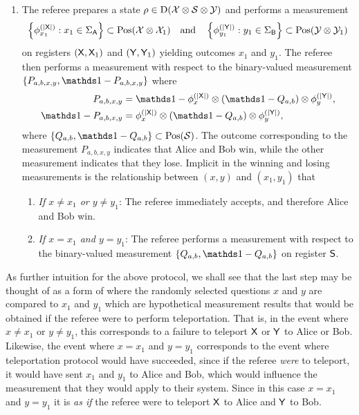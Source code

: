 \begin{enumerate}
	\item The referee prepares a state $\rho \in \mathrm{D}(\mathcal{X} \otimes \mathcal{S} \otimes \mathcal{Y})$ and performs a measurement
		\begin{align} \label{eq:bell-basis-telep-game-2}
			\left \{ \phi_{x_1}^{(\left\lvert \mathsf{X} \right\rvert)} : x_1 \in \Sigma_{\mathsf{A}} \right \} \subset \mathrm{Pos}(\mathcal{X} \otimes \mathcal{X}_1) \quad \textnormal{and} \quad \left \{ \phi_{y_1}^{(\left\lvert \mathsf{Y} \right\rvert)} : y_1 \in \Sigma_{\mathsf{B}}  \right \} \subset \mathrm{Pos}(\mathcal{Y} \otimes \mathcal{Y}_1)
		\end{align}		
on registers $(\mathsf{X},\mathsf{X}_1)$ and $(\mathsf{Y},\mathsf{Y}_1)$ yielding outcomes $x_1$ and $y_1$. The referee then performs a measurement with respect to the binary-valued measurement $\{ P_{a,b,x,y}, \I - P_{a,b,x,y} \}$ where
\begin{equation} \label{eq:ref-meas-telep-enlg}
	\begin{aligned}
		P_{a,b,x,y} &= \I - \phi^{(\abs{\reg{X}})}_{x} \otimes \left( \I - Q_{a,b} \right) \otimes \phi^{(\abs{\reg{Y}})}_y, \\
		\I - P_{a,b,x,y} &= \phi^{(\abs{\reg{X}})}_{x} \otimes \left( \I - Q_{a,b} \right) \otimes \phi^{(\abs{\reg{Y}})}_y, \\
	\end{aligned}	
\end{equation}	 
where $\{Q_{a,b}, \I - Q_{a,b} \} \subset \Pos(\S)$. The outcome corresponding to the measurement $P_{a,b,x,y}$ indicates that Alice and Bob win, while the other measurement indicates that they lose. Implicit in the winning and losing measurements is the relationship between $(x,y)$ and $(x_1,y_1)$ that
\begin{enumerate}
		\item \emph{If $x \not= x_1$ or $y \not= y_1$}: The referee immediately accepts, and therefore Alice and Bob win. 
		\item \emph{If $x = x_1$ and $y = y_1$}: The referee performs a measurement with respect to the binary-valued measurement $\{Q_{a,b}, \I - Q_{a,b} \}$ on register $\mathsf{S}$.
	\end{enumerate}
\end{enumerate}
As further intuition for the above protocol, we shall see that the last step may be thought of as a form of  where the randomly selected questions $x$ and $y$ are compared to $x_1$ and $y_1$ which are hypothetical measurement results that would be obtained if the referee were to perform teleportation. That is, in the event where $x \not= x_1$ or $y \not= y_1$, this corresponds to a failure to teleport $\mathsf{X}$ or $\mathsf{Y}$ to Alice or Bob. Likewise, the event where $x = x_1$ and $y = y_1$ corresponds to the event where teleportation protocol would have succeeded, since if the referee \emph{were} to teleport, it would have sent $x_1$ and $y_1$ to Alice and Bob, which would influence the measurement that they would apply to their system. Since in this case $x = x_1$ and $y = y_1$ it is \emph{as if} the referee were to teleport $\mathsf{X}$ to Alice and $\mathsf{Y}$ to Bob.

